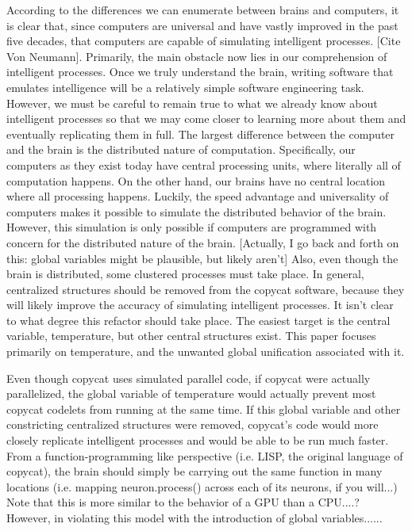 \documentclass[a4paper]{article}
\begin{document}
    According to the differences we can enumerate between brains and computers, it is clear that, since computers are universal and have vastly improved in the past five decades, that computers are capable of simulating intelligent processes. 
    [Cite Von Neumann]. 
    Primarily, the main obstacle now lies in our comprehension of intelligent processes. 
    Once we truly understand the brain, writing software that emulates intelligence will be a relatively simple software engineering task. 
    However, we must be careful to remain true to what we already know about intelligent processes so that we may come closer to learning more about them and eventually replicating them in full. 
    The largest difference between the computer and the brain is the distributed nature of computation. 
    Specifically, our computers as they exist today have central processing units, where literally all of computation happens. 
    On the other hand, our brains have no central location where all processing happens. 
    Luckily, the speed advantage and universality of computers makes it possible to simulate the distributed behavior of the brain. 
    However, this simulation is only possible if computers are programmed with concern for the distributed nature of the brain.
    [Actually, I go back and forth on this: global variables might be plausible, but likely aren't]
    Also, even though the brain is distributed, some clustered processes must take place.
    In general, centralized structures should be removed from the copycat software, because they will likely improve the accuracy of simulating intelligent processes.
    It isn't clear to what degree this refactor should take place.
    The easiest target is the central variable, temperature, but other central structures exist.
    This paper focuses primarily on temperature, and the unwanted global unification associated with it.

    Even though copycat uses simulated parallel code, if copycat were actually parallelized, the global variable of temperature would actually prevent most copycat codelets from running at the same time.
    If this global variable and other constricting centralized structures were removed, copycat's code would more closely replicate intelligent processes and would be able to be run much faster.
    From a function-programming like perspective (i.e. LISP, the original language of copycat), the brain should simply be carrying out the same function in many locations (i.e. mapping neuron.process() across each of its neurons, if you will...)
    Note that this is more similar to the behavior of a GPU than a CPU....?
    However, in violating this model with the introduction of global variables......
\end{document}
